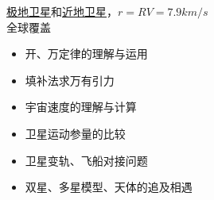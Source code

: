 \underline{极地卫星}和\underline{近地卫星}，\quad $r=R$\quad $V=7.9\unit{km/s}$\\
全球覆盖 %

\begin{itemize}
  \item 开、万定律的理解与运用
  \item 填补法求万有引力
  \item 宇宙速度的理解与计算
  \item 卫星运动参量的比较
  \item 卫星变轨、飞船对接问题
  \item 双星、多星模型、天体的追及相遇 %
\end{itemize}
